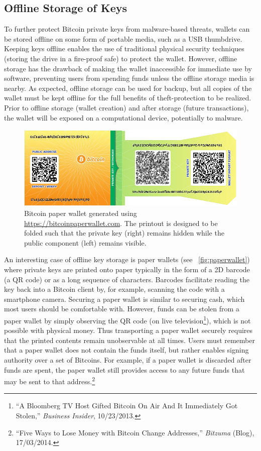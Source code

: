 \subsection{Offline Storage of Keys}
\label{sec:offline storage}
To further protect Bitcoin private keys from malware-based threats, wallets can be stored offline on some form of portable media, such as a USB thumbdrive. Keeping keys offline enables the use of traditional physical security techniques (\eg storing the drive in a fire-proof safe) to protect the wallet. However, offline storage has the drawback of making the wallet inaccessible for immediate use by software, preventing users from spending funds unless the offline storage media is nearby. As expected, offline storage can be used for backup, but all copies of the wallet must be kept offline for the full benefits of theft-protection to be realized. Prior to offline storage (wallet creation) and after storage (future transactions), the wallet will be exposed on a computational device, potentially to malware. 

\begin{figure}[pt]
  \includegraphics[width=.48\textwidth]{figures/paperwallet.png}
  \caption{Bitcoin paper wallet generated using \url{https://bitcoinpaperwallet.com}. The printout is designed to be folded such that the private key (right) remains hidden while the public component (left) remains visible.}
  \label{fig:paperwallet}
\end{figure}

An interesting case of offline key storage is paper wallets (see ~\autoref{fig:paperwallet})
where private keys are printed onto paper typically in the form of a 2D barcode (\eg a QR code) or as a long sequence of characters. Barcodes facilitate reading the key back into a Bitcoin client by, for example, scanning the code with a smartphone camera. Securing a paper wallet is similar to securing cash, which most users should be comfortable with. However, funds can be stolen from a paper wallet by simply observing the QR code (\eg on live television\footnote{``A Bloomberg TV Host Gifted Bitcoin On Air And It Immediately Got Stolen,'' \textit{Business Insider}, 10/23/2013.}), which is not possible with physical money. Thus transporting a paper wallet securely requires that the printed contents remain unobservable at all times.  Users must remember that a paper wallet does not contain the funds itself, but rather enables signing authority over a set of Bitcoins. For example, if a paper wallet is discarded after funds are spent, the paper wallet still provides access to any future funds that may be sent to that address.\footnote{``Five Ways to Lose Money with Bitcoin Change Addresses,'' \textit{Bitzuma} (Blog), 17/03/2014.} 

